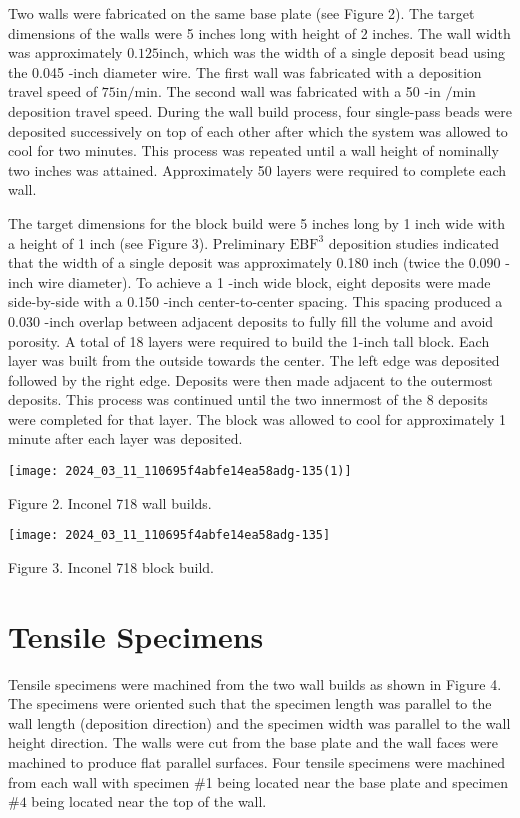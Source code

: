 \documentclass[10pt]{article}
\begin{document}
Two walls were fabricated on the same base plate (see Figure 2). The target dimensions of the walls were 5 inches long with height of 2 inches. The wall width was approximately $0.125 \mathrm{inch}$, which was the width of a single deposit bead using the 0.045 -inch diameter wire. The first wall was fabricated with a deposition travel speed of $75 \mathrm{in} / \mathrm{min}$. The second wall was fabricated with a 50 -in $/ \mathrm{min}$ deposition travel speed. During the wall build process, four single-pass beads were deposited successively on top of each other after which the system was allowed to cool for two minutes. This process was repeated until a wall height of nominally two inches was attained. Approximately 50 layers were required to complete each wall.

The target dimensions for the block build were 5 inches long by 1 inch wide with a height of 1 inch (see Figure 3). Preliminary $\mathrm{EBF}^{3}$ deposition studies indicated that the width of a single deposit was approximately 0.180 inch (twice the 0.090 -inch wire diameter). To achieve a 1 -inch wide block, eight deposits were made side-by-side with a 0.150 -inch center-to-center spacing. This spacing produced a 0.030 -inch overlap between adjacent deposits to fully fill the volume and avoid porosity. A total of 18 layers were required to build the 1-inch tall block. Each layer was built from the outside towards the center. The left edge was deposited followed by the right edge. Deposits were then made adjacent to the outermost deposits. This process was continued until the two innermost of the 8 deposits were completed for that layer. The block was allowed to cool for approximately 1 minute after each layer was deposited.

\begin{center}
\texttt{[image: 2024\_03\_11\_110695f4abfe14ea58adg-135(1)]}
\end{center}

Figure 2. Inconel 718 wall builds.

\begin{center}
\texttt{[image: 2024\_03\_11\_110695f4abfe14ea58adg-135]}
\end{center}

Figure 3. Inconel 718 block build.

\section*{Tensile Specimens}
Tensile specimens were machined from the two wall builds as shown in Figure 4. The specimens were oriented such that the specimen length was parallel to the wall length (deposition direction) and the specimen width was parallel to the wall height direction. The walls were cut from the base plate and the wall faces were machined to produce flat parallel surfaces. Four tensile specimens were machined from each wall with specimen \#1 being located near the base plate and specimen $\# 4$ being located near the top of the wall.
\end{document}
